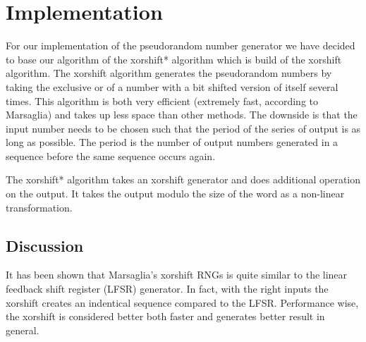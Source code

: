 \section{Implementation}
For our implementation of the pseudorandom number generator we have decided to base our algorithm of the xorshift* algorithm which is build of the xorshift algorithm\cite{xorshift}. The xorshift algorithm generates the pseudorandom numbers by taking the exclusive or of a number with a bit shifted version of itself several times. This algorithm is both very efficient (extremely fast, according to Marsaglia) and takes up less space than other methods. The downside is that the input number needs to be chosen such that the period of the series of output is as long as possible. The period is the number of output numbers generated in a sequence before the same sequence occurs again. 

The xorshift* algorithm takes an xorshift generator and does additional operation on the output. It takes the output modulo the size of the word as a non-linear transformation. 

\subsection{Discussion}
It has been shown that Marsaglia's xorshift RNGs is quite similar to the linear feedback shift register (LFSR) generator\cite{brent}. In fact, with the right inputs the xorshift creates an indentical sequence compared to the LFSR. Performance wise, the xorshift is considered better both faster and generates better result in general.

